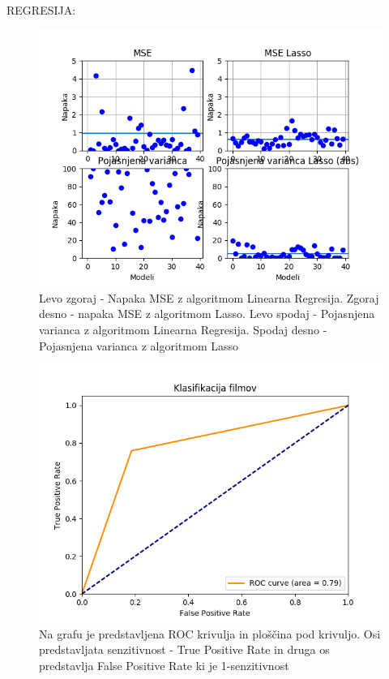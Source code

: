 \documentclass[a4paper,11pt]{article}
\begin{document}
REGRESIJA:
\begin{figure}[!htb]
	\begin{center}
		\includegraphics[scale=0.8]{slike/regresija.png}
		\caption{Levo zgoraj - Napaka MSE z algoritmom Linearna Regresija. Zgoraj desno - napaka MSE z algoritmom Lasso.
			Levo spodaj - Pojasnjena varianca z algoritmom Linearna Regresija. Spodaj desno - Pojasnjena varianca z algoritmom Lasso}
		\label{slika 2}
	\end{center}
\end{figure}


\begin{figure}[!htb]
	\begin{center}
		\includegraphics[scale=0.8]{slike/klasifikacija.png}
		\caption{Na grafu je predstavljena ROC krivulja in ploščina pod krivuljo. Osi predstavljata senzitivnost - True Positive Rate in druga os predstavlja False Positive Rate ki je 1-senzitivnost}
		\label{slika 3}
	\end{center}
\end{figure}
\end{document}
